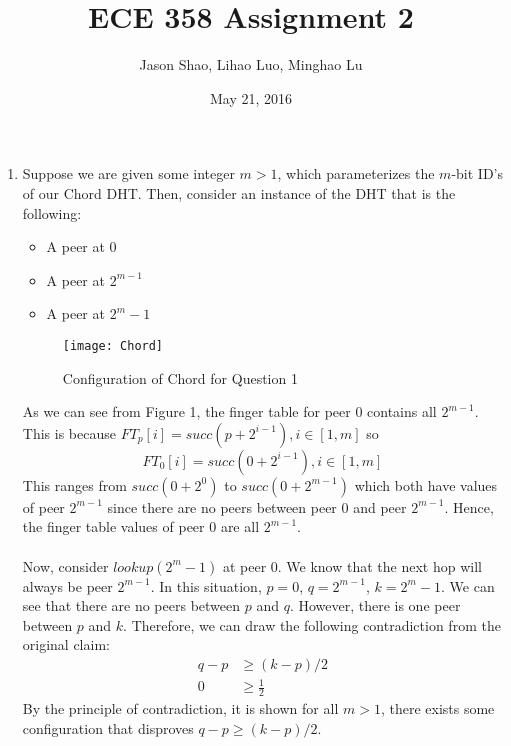 \documentclass[12pt]{article}
\title{ECE 358 Assignment 2}
\author{Jason Shao, Lihao Luo, Minghao Lu}
\date{May 21, 2016}
\begin{document}
\maketitle
\renewcommand{\thesubsection}{Problem \arabic{subsection}}


\def\question#1{\item[\bf #1.]}
\def\part#1{\item[\bf #1)]}
\newcommand{\pc}[1]{\mbox{\textbf{#1}}} %

\begin{enumerate}
    \item 
    Suppose we are given some integer $m > 1$, which parameterizes the $m$-bit ID's of our Chord DHT. Then, consider an instance of the DHT that is the following:
    \begin{itemize}
        \item A peer at 0
        \item A peer at $2^{m-1}$
        \item A peer at $2^{m} - 1$
    \end{itemize}
    
    \begin{figure}[!ht]
    \centering
    \texttt{[image: Chord]}
    \caption{Configuration of Chord for Question 1}
	\end{figure}
    As we can see from Figure 1, the finger table for peer 0 contains all $2^{m-1}$. This is because $FT_p[i] = succ(p + 2^{i-1}) , i \in [1,m]$ so $$FT_0[i] = succ(0 + 2^{i-1}), i \in [1, m]$$
    This ranges from $succ(0 + 2^0)$ to $succ(0 + 2^{m-1})$ which both have values of peer $2^{m-1}$ since there are no peers between peer 0 and peer $2^{m-1}$. Hence, the finger table values of peer 0 are all $2^{m-1}$. \\ \\
    Now, consider $lookup(2^m - 1)$ at peer 0. We know that the next hop will always be peer $2^{m-1}$. In this situation, $p = 0$, $q = 2^{m-1}$, $k = 2^m - 1$. We can see that there are no peers between $p$ and $q$. However, there is one peer between $p$ and $k$. Therefore, we can draw the following contradiction from the original claim:
    \begin{align*}
    q - p &\ge (k-p)/2 \\
    0 &\ge \frac{1}{2}
    \end{align*}
    By the principle of contradiction, it is shown for all $m > 1$, there exists some configuration that disproves $ q - p \ge (k-p)/2 $.
    

\end{enumerate}
\end{document}
